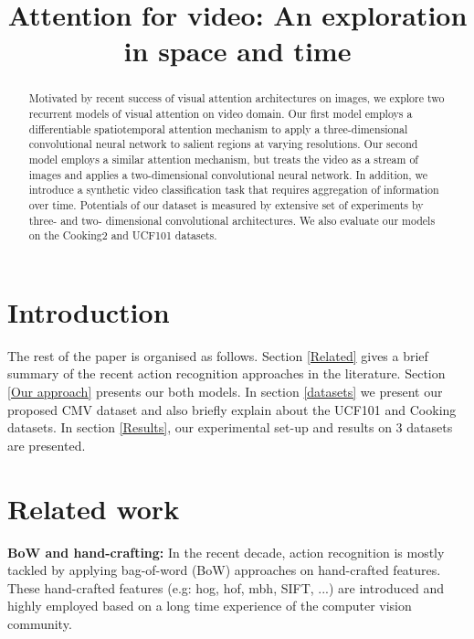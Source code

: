 \documentclass{article} %
\title{Attention for video: An exploration in space and time}
\begin{document}
\maketitle

\begin{abstract}
Motivated by recent success of visual attention architectures on images, we explore two recurrent models of visual attention on video domain. Our first model employs a differentiable spatiotemporal attention mechanism to apply a three-dimensional convolutional neural network to salient regions at varying resolutions. Our second model employs a similar attention mechanism, but treats the video as a stream of images and applies a two-dimensional convolutional neural network. In addition, we introduce a synthetic video classification task that requires aggregation of information over time. Potentials of our dataset is measured by extensive set of experiments by three- and two- dimensional convolutional architectures. We also evaluate our models on the Cooking2 and UCF101 datasets.
\end{abstract}

\section{Introduction}
The rest of the paper is organised as follows.
Section \ref{Related} gives a brief summary of the recent action recognition approaches in the literature. 
Section \ref{Our approach} presents our both models. In section \ref{datasets} we present our proposed CMV dataset and also briefly explain about the UCF101 and Cooking datasets. In section \ref{Results}, our experimental set-up and results on 3 datasets are presented.
\section{Related work}
\textbf{BoW and hand-crafting:} In the recent decade, action recognition is mostly tackled by applying bag-of-word (BoW) approaches on hand-crafted features. These hand-crafted features (e.g: hog, hof, mbh, SIFT, ...) are introduced and highly employed based on a long time experience of the computer vision community. 
\end{document}
